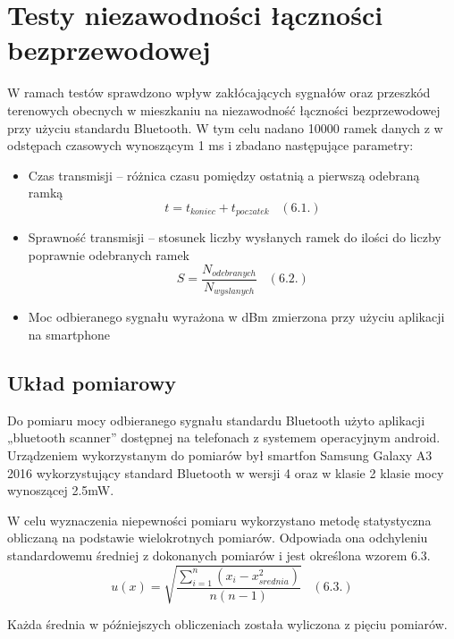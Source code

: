 \documentclass[12pt, twoside, openany]{mwrep}
\begin{document}
\section{Testy niezawodności łączności bezprzewodowej}
W ramach testów sprawdzono wpływ zakłócających sygnałów oraz przeszkód terenowych obecnych w mieszkaniu na niezawodność łączności bezprzewodowej przy użyciu standardu Bluetooth. W tym celu nadano 10000 ramek danych z w odstępach czasowych wynoszącym 1 ms i zbadano następujące parametry:

\begin{itemize}
\item Czas transmisji – różnica czasu pomiędzy ostatnią a pierwszą odebraną ramką \[ t = t_{koniec} + t_{poczatek} \; \; \;  (6.1.)\]
\item	Sprawność transmisji – stosunek liczby wysłanych ramek do ilości do liczby poprawnie odebranych ramek \[ S = \frac{N_{odebranych}}{N_{wyslanych}} \; \; \;  (6.2.)\]
\item	Moc odbieranego sygnału wyrażona w dBm zmierzona przy użyciu aplikacji na smartphone 
\end{itemize}

\subsection{Układ pomiarowy}
Do pomiaru mocy odbieranego sygnału standardu Bluetooth użyto aplikacji „bluetooth scanner” dostępnej na telefonach z systemem operacyjnym android. Urządzeniem wykorzystanym do pomiarów był smartfon Samsung Galaxy A3 2016 wykorzystujący standard Bluetooth w wersji 4 oraz w klasie 2 klasie mocy wynoszącej 2.5mW.
\par
W celu wyznaczenia niepewności pomiaru wykorzystano metodę statystyczna obliczaną na podstawie wielokrotnych pomiarów. Odpowiada ona odchyleniu standardowemu średniej z dokonanych pomiarów i jest określona wzorem 6.3.
\[ u(x) = \sqrt{ \frac{ \sum_{i=1}^{n} (x_i -x_{srednia}^2) } { n(n-1)  }}  \; \; \;  (6.3.)\]
\par
Każda średnia w późniejszych obliczeniach została wyliczona z pięciu pomiarów.	

\end{document}
